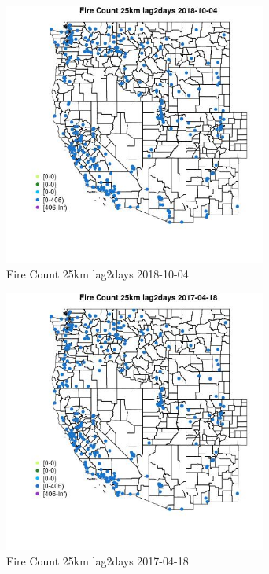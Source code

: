\begin{figure} 
\centering  
\includegraphics[width=0.77\textwidth]{Code_Outputs/Report_ML_input_PM25_Step4_part_f_de_duplicated_aves_prioritize_24hr_obswNAs_MapObsFire_Count_25km_lag2days2018-10-04.jpg} 
\caption{\label{fig:Report_ML_input_PM25_Step4_part_f_de_duplicated_aves_prioritize_24hr_obswNAsMapObsFire_Count_25km_lag2days2018-10-04}Fire Count 25km lag2days 2018-10-04} 
\end{figure} 
 

\clearpage 

\begin{figure} 
\centering  
\includegraphics[width=0.77\textwidth]{Code_Outputs/Report_ML_input_PM25_Step4_part_f_de_duplicated_aves_prioritize_24hr_obswNAs_MapObsFire_Count_25km_lag2days2017-04-18.jpg} 
\caption{\label{fig:Report_ML_input_PM25_Step4_part_f_de_duplicated_aves_prioritize_24hr_obswNAsMapObsFire_Count_25km_lag2days2017-04-18}Fire Count 25km lag2days 2017-04-18} 
\end{figure} 
 

